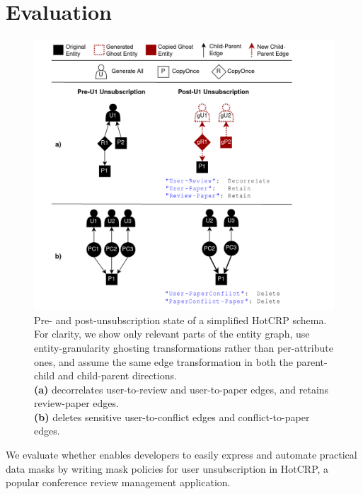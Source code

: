 \section{Evaluation}
\label{sec:hotcrp_example}

\begin{figure}[t!]
    \centering
    \includegraphics[width=.55\textwidth]{img/decor_hotcrp}

    \caption{Pre- and post-unsubscription state of a simplified HotCRP schema. For clarity,
        we show only relevant parts of the entity graph, use entity-granularity ghosting
        transformations rather than per-attribute ones, and assume the same edge transformation in both
        the parent-child and child-parent directions.\\
        \textbf{(a)} \sys decorrelates user-to-review and user-to-paper edges, and retains
        review-paper edges. \\%
        \textbf{(b)} \sys deletes sensitive user-to-conflict edges and conflict-to-paper edges. 
    }
    \label{fig:hotcrp}
\end{figure}

We evaluate whether \name enables developers to easily express and automate practical data masks by
writing mask policies for user unsubscription in HotCRP, a popular conference review management
application.%

